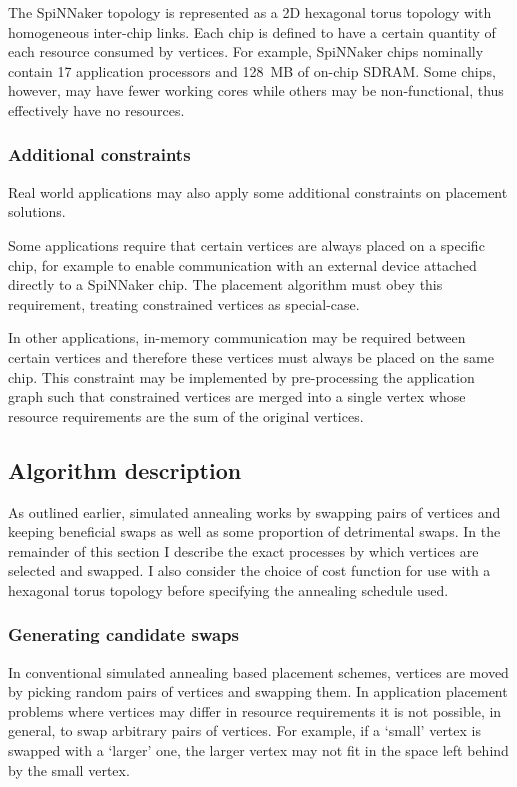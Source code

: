 			The SpiNNaker topology is represented as a 2D hexagonal torus topology
			with homogeneous inter-chip links. Each chip is defined to have a certain
			quantity of each resource consumed by vertices. For example, SpiNNaker
			chips nominally contain 17 application processors and 128~MB of on-chip
			SDRAM. Some chips, however, may have fewer working cores while others may
			be non-functional, thus effectively have no resources.
			
			\subsubsection{Additional constraints}
				
				Real world applications may also apply some additional constraints on
				placement solutions.
				
				Some applications require that certain vertices are always placed on a
				specific chip, for example to enable communication with an external
				device attached directly to a SpiNNaker chip. The placement algorithm
				must obey this requirement, treating constrained vertices as
				special-case.
				
				In other applications, in-memory communication may be required between
				certain vertices and therefore these vertices must always be placed on
				the same chip. This constraint may be implemented by pre-processing the
				application graph such that constrained vertices are merged into a
				single vertex whose resource requirements are the sum of the original
				vertices.
		
		\subsection{Algorithm description}
			
			As outlined earlier, simulated annealing works by swapping pairs of
			vertices and keeping beneficial swaps as well as some proportion of
			detrimental swaps. In the remainder of this section I describe the exact
			processes by which vertices are selected and swapped. I also consider the
			choice of cost function for use with a hexagonal torus topology before
			specifying the annealing schedule used.
		
			\subsubsection{Generating candidate swaps}
				
				In conventional simulated annealing based placement schemes, vertices
				are moved by picking random pairs of vertices and swapping them. In
				application placement problems where vertices may differ in resource
				requirements it is not possible, in general, to swap arbitrary pairs of
				vertices. For example, if a `small' vertex is swapped with a `larger'
				one, the larger vertex may not fit in the space left behind by the
				small vertex.
				
